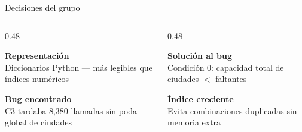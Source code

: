 \documentclass[aspectratio=169, 10pt]{beamer}
\begin{document}
\begin{frame}{Decisiones \alert{del grupo}}
  \vspace{0.2cm}
  \begin{columns}[T]
    \begin{column}{0.48\textwidth}
      \begin{tarjeta}
        {\small\bfseries Representación}\\
        {\footnotesize\color{cgris} Diccionarios Python — más legibles que índices numéricos}
      \end{tarjeta}\vspace{4pt}
      \begin{tarjeta}
        {\small\bfseries Bug encontrado}\\
        {\footnotesize\color{cgris} C3 tardaba 8,380 llamadas sin poda global de ciudades}
      \end{tarjeta}
    \end{column}
    \begin{column}{0.48\textwidth}
      \begin{tarjeta}
        {\small\bfseries Solución al bug}\\
        {\footnotesize\color{cgris} Condición 0: capacidad total de ciudades $<$ faltantes}
      \end{tarjeta}\vspace{4pt}
      \begin{tarjeta}
        {\small\bfseries Índice creciente}\\
        {\footnotesize\color{cgris} Evita combinaciones duplicadas sin memoria extra}
      \end{tarjeta}
    \end{column}
  \end{columns}
\end{frame}
\end{document}
